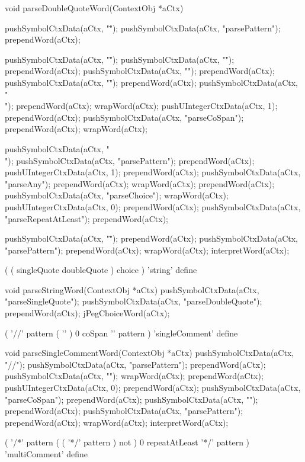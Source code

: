 \startCCode
void parseDoubleQuoteWord(ContextObj *aCtx) {
  pushSymbolCtxData(aCtx, "\"");
  pushSymbolCtxData(aCtx, "parsePattern");
  prependWord(aCtx);
  
  pushSymbolCtxData(aCtx, "\"");
  pushSymbolCtxData(aCtx, "\r");
  prependWord(aCtx);
  pushSymbolCtxData(aCtx, "\n");
  prependWord(aCtx);
  pushSymbolCtxData(aCtx, "\f");
  prependWord(aCtx);
  pushSymbolCtxData(aCtx, "\\");
  prependWord(aCtx);
  wrapWord(aCtx);
  pushUIntegerCtxData(aCtx, 1);
  prependWord(aCtx);
  pushSymbolCtxData(aCtx, "parseCoSpan");
  prependWord(aCtx);
  wrapWord(aCtx);
  
  pushSymbolCtxData(aCtx, "\\");
  pushSymbolCtxData(aCtx, "parsePattern");
  prependWord(aCtx);
  pushUIntegerCtxData(aCtx, 1);
  prependWord(aCtx);
  pushSymbolCtxData(aCtx, "parseAny");
  prependWord(aCtx);
  wrapWord(aCtx);
  prependWord(aCtx);
  pushSymbolCtxData(aCtx, "parseChoice");
  wrapWord(aCtx);
  pushUIntegerCtxData(aCtx, 0);
  prependWord(aCtx);
  pushSymbolCtxData(aCtx, "parseRepeatAtLeast");
  prependWord(aCtx);
  
  pushSymbolCtxData(aCtx, "\"");
  prependWord(aCtx);
  pushSymbolCtxData(aCtx, "parsePattern");
  prependWord(aCtx);
  wrapWord(aCtx);
  interpretWord(aCtx);
}
\stopCCode

\starttyping
(
  ( singleQuote doubleQuote ) choice
) 'string' define
\stoptyping

\startCCode
void parseStringWord(ContextObj *aCtx) {
  pushSymbolCtxData(aCtx, "parseSingleQuote");
  pushSymbolCtxData(aCtx, "parseDoubleQuote");
  prependWord(aCtx);
  jPegChoiceWord(aCtx);
}
\stopCCode

\starttyping
(
  '//' pattern
  ( '\n' ) 0 coSpan
  '\n' pattern
) 'singleComment' define
\stoptyping

\startCCode
void parseSingleCommentWord(ContextObj *aCtx) {
  pushSymbolCtxData(aCtx, "//");
  pushSymbolCtxData(aCtx, "parsePattern");
  prependWord(aCtx);
  pushSymbolCtxData(aCtx, "\n");
  wrapWord(aCtx);
  prependWord(aCtx);
  pushUIntegerCtxData(aCtx, 0);
  prependWord(aCtx);
  pushSymbolCtxData(aCtx, "parseCoSpan");
  prependWord(aCtx);
  pushSymbolCtxData(aCtx, "\n");
  prependWord(aCtx);
  pushSymbolCtxData(aCtx, "parsePattern");
  prependWord(aCtx);
  wrapWord(aCtx);
  interpretWord(aCtx);
}
\stopCCode

\starttyping
(
  '/*' pattern
  ( ( '*/' pattern ) not ) 0 repeatAtLeast
  '*/' pattern
) 'multiComment' define
\stoptyping

